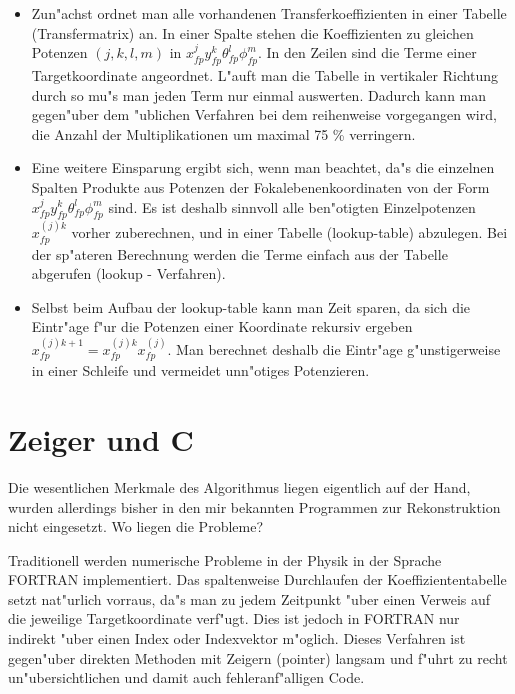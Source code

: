 \begin{itemize}
\item 
        Zun"achst ordnet man alle vorhandenen Transferkoeffizienten in
        einer Tabelle (Transfermatrix) an. In einer Spalte stehen die 
        Koeffizienten zu gleichen Potenzen $ (j,k,l,m)$  in 
          $ x_{fp}^j y_{fp}^k \theta _{fp}^l \phi _{fp} ^{m}.$ 
        In den Zeilen sind die Terme einer Targetkoordinate angeordnet.
        L"auft man die Tabelle in vertikaler Richtung durch so mu"s man
        jeden Term nur einmal auswerten. Dadurch kann man gegen"uber dem
        "ublichen Verfahren bei dem reihenweise vorgegangen wird, die
        Anzahl der Multiplikationen um maximal 75 \%  verringern.
         
\item
        Eine weitere Einsparung ergibt sich, wenn man beachtet, da"s die
        einzelnen Spalten Produkte aus Potenzen der Fokalebenenkoordinaten
        von der Form $  x_{fp}^j y_{fp}^k \theta _{fp}^l \phi _{fp} ^m $
        sind. Es ist deshalb sinnvoll alle ben"otigten Einzelpotenzen
        $ x_{fp}^{(j) k}$  vorher zuberechnen, und in einer 
        Tabelle (lookup-table) abzulegen.
        Bei der sp"ateren Berechnung werden die Terme einfach aus der 
        Tabelle abgerufen (lookup - Verfahren).
\item
        Selbst beim Aufbau der lookup-table kann man Zeit sparen, da sich
        die Eintr"age f"ur die Potenzen einer Koordinate rekursiv ergeben
        $ x_{fp}^{(j) k+1} = x_{fp}^{(j) k} x_{fp}^{(j)} $. 
        Man berechnet deshalb die Eintr"age g"unstigerweise
        in einer Schleife und vermeidet unn"otiges Potenzieren.

\end{itemize}

\section{Zeiger und C}

Die wesentlichen Merkmale des Algorithmus liegen eigentlich auf der
Hand, wurden allerdings bisher in den mir bekannten Programmen zur
Rekonstruktion nicht eingesetzt. Wo liegen die Probleme? 

Traditionell werden
numerische Probleme in der Physik in der Sprache FORTRAN implementiert.
Das spaltenweise Durchlaufen der Koeffiziententabelle setzt nat"urlich
vorraus, da"s man zu jedem Zeitpunkt "uber einen Verweis auf die jeweilige
Targetkoordinate verf"ugt. Dies ist jedoch in FORTRAN nur indirekt "uber
einen Index oder Indexvektor m"oglich. 
Dieses Verfahren ist gegen"uber direkten Methoden mit Zeigern
(pointer) langsam und f"uhrt zu recht un"ubersichtlichen und damit auch 
fehleranf"alligen Code. 

